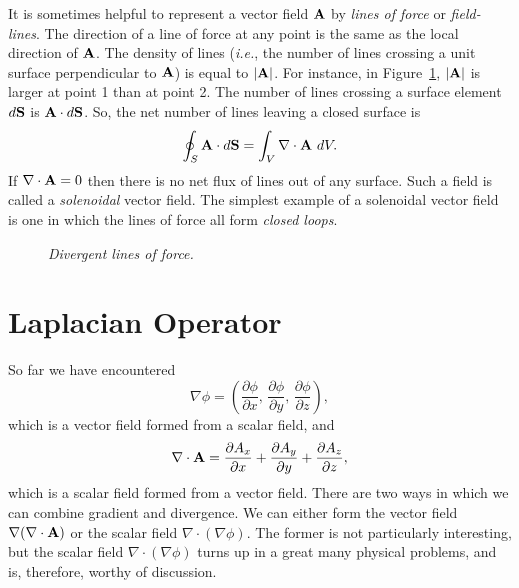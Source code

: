 It is sometimes helpful to represent a vector field ${\bf A}$ by {\em lines of force}
or  {\em field-lines}.
The direction of a line of force at any point is the same as the local direction of
${\bf A}$. The density of lines ({\em i.e.}, the number of lines crossing a unit surface
perpendicular to ${\bf A}$) is equal to $|{\bf A}|$. 
 For instance, in Figure~\ref{f20}, $|{\bf A}|$ is larger at point 1 than at point 2. The number of lines
crossing a surface element $d{\bf S}$ is ${\bf A}\cdot d{\bf S}$. So, the
net number of lines leaving a closed surface is
\begin{equation}
\oint_S {\bf A}\cdot d{\bf S} = \int_V \nabla\cdot{\bf A}\,\,dV.
\end{equation}
If $\nabla\cdot{\bf A}=0$ then there is no net flux of lines out of any surface.
 Such a field is
called a {\em solenoidal}\/ vector field. The simplest example of a solenoidal vector
field is one in which the lines of force all form {\em closed loops}.
\begin{figure}
\epsfysize=1.5in
\centerline{}
\caption{\em Divergent lines of force.}\label{f20}
\end{figure}

\section{Laplacian Operator}\label{qlap}
So far we have encountered
\begin{equation}
\nabla\phi = \left(\frac{\partial \phi}{\partial x},\, \frac{\partial \phi}
{\partial y},\, \frac{\partial \phi}{\partial z}\right),
\end{equation}
which is a vector field formed from a scalar field, and 
\begin{equation}
\nabla\cdot{\bf A} = \frac{\partial A_x}{\partial x} + 
\frac{\partial A_y}{\partial y}  +\frac{\partial A_z}{\partial z},
\end{equation}
which is a scalar field formed from a vector field. There are two ways in which
we can combine gradient and divergence. We can either form the vector field 
$\nabla(\nabla\cdot{\bf A})$ or  the scalar field $\nabla\cdot(\nabla\phi)$.
The former is not particularly interesting, but the scalar field 
$\nabla\cdot(\nabla\phi)$ turns up in a great many physical problems, and is, 
therefore, worthy of discussion. 

